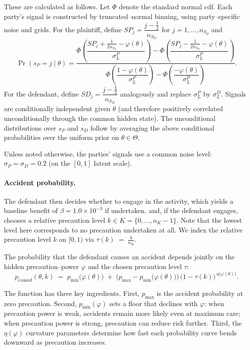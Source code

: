 \documentclass{article}
\begin{document}
These are calculated as follows. Let $\Phi$ denote the standard normal cdf. Each party’s signal is constructed by truncated–normal binning, using party–specific noise and grids. For the plaintiff, define $SP_j=\dfrac{j-\tfrac12}{n_{S_P}}$ for $j=1,\dots,n_{S_P}$ and
\[
\Pr(s_P=j\mid \theta)
=
\frac{
\Phi\!\left(\dfrac{SP_j+\tfrac{1}{2n_{S_P}}-\varphi(\theta)}{\sigma_L^{P}}\right)
-
\Phi\!\left(\dfrac{SP_j-\tfrac{1}{2n_{S_P}}-\varphi(\theta)}{\sigma_L^{P}}\right)
}{
\Phi\!\left(\dfrac{1-\varphi(\theta)}{\sigma_L^{P}}\right)
-
\Phi\!\left(\dfrac{-\varphi(\theta)}{\sigma_L^{P}}\right)
}.
\]
For the defendant, define $SD_j=\dfrac{j-\tfrac12}{n_{S_D}}$ analogously and replace $\sigma_L^{P}$ by $\sigma_L^{D}$. Signals are conditionally independent given $\theta$ (and therefore positively correlated unconditionally through the common hidden state). The unconditional distributions over $s_P$ and $s_D$ follow by averaging the above conditional probabilities over the uniform prior on $\theta\in\Theta$. 

Unless noted otherwise, the parties' signals use a common noise level:
$\sigma_P = \sigma_D = 0.2$ (on the $[0,1]$ latent scale). 

\paragraph{Accident probability.}

The defendant then decides whether to engage in the activity, which yields a baseline benefit of $\beta = 1.0 \times 10^{-3}$ if undertaken, and, if the defendant engages, chooses a relative precaution level $k \in K = \{0,\dots,n_K-1\}$. Note that the lowest level here corresponds to no precaution undertaken at all. We index the relative precaution level $k$ on $[0,1)$ via $\tau(k) \;=\; \frac{k}{n_K }$.

The probability that the defendant causes an accident depends jointly on the hidden precaution–power $\varphi$ and the chosen precaution level $\tau$:
\[
p_{\mathrm{caused}}(\theta,k)
\;=\;
p_{\min}\!\bigl(\varphi(\theta)\bigr)
\;+\;
\bigl(p_{\max}-p_{\min}\!\bigl(\varphi(\theta)\bigr)\bigr)\,
\bigl(1-\tau(k)\bigr)^{\,\eta\!\bigl(\varphi(\theta)\bigr)}.
\]

The function has three key ingredients. First, $p_{\max}$ is the accident probability at zero precaution. Second, $p_{\min}(\varphi)$ sets a floor that declines with $\varphi$: when precaution power is weak, accidents remain more likely even at maximum care; when precaution power is strong, precaution can reduce risk further. Third, the  $\eta(\varphi)$ curvature parameters determine how fast each probability curve bends downward as precaution increases.
\end{document}
